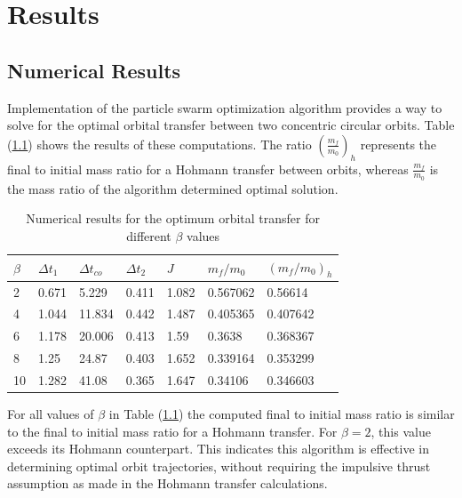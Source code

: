 \chapter{Results}


\section{Numerical Results}

\noindent Implementation of the particle swarm optimization algorithm provides a way to solve
for the optimal orbital transfer between two concentric circular orbits. Table (\ref{tab:Numerical-Results}) shows
the results of these computations. The ratio $(\frac{m_f}{m_{0}})_h$ represents the final to initial mass
ratio for a Hohmann transfer between orbits, whereas $\frac{m_f}{m_0}$ is the mass ratio of the algorithm 
determined optimal solution.


\begin{table}[H]
  \centering
  \begin{tabular}{@{}lllllll@{}}
  \toprule
  $\beta$ & $\Delta t_1$ & $\Delta t_{co}$ & $\Delta t_2$ & $J$ & $m_f/m_0$ & $(m_f/m_0)_h$ \\ \midrule
  2 & 0.671 & 5.229 & 0.411 & 1.082 & 0.567062 & 0.56614 \\
  4 & 1.044 & 11.834 & 0.442 & 1.487 & 0.405365 & 0.407642 \\
  6 & 1.178 & 20.006 & 0.413 & 1.59 & 0.3638 & 0.368367 \\
  8 & 1.25 & 24.87 & 0.403 & 1.652 & 0.339164 & 0.353299 \\
  10 & 1.282 & 41.08 & 0.365 & 1.647 & 0.34106 & 0.346603 \\ \bottomrule
  \end{tabular}
  \caption{Numerical results for the optimum orbital transfer for different $\beta$ values }
  \label{tab:Numerical-Results}
  \end{table}

\noindent For all values of $\beta$ in Table (\ref{tab:Numerical-Results}) the computed final to initial mass ratio is similar to the final to 
initial mass ratio for a Hohmann transfer. For $\beta = 2$, this value exceeds its Hohmann
counterpart. This indicates this algorithm is effective in determining optimal orbit trajectories, without
requiring the impulsive thrust assumption as made in the Hohmann transfer calculations.

